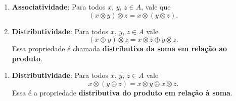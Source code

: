 \documentclass{beamer}
\begin{document}
    \begin{frame}
        \begin{definicao}
            \begin{enumerate}[label={\roman*})]
                \conti

                \item \textbf{Associatividade}: Para todos $x$, $y$, $z \in A$, vale que
                \[
                    (x\otimes y) \otimes z = x\otimes (y\otimes z).
                \]

                \vspace{.7cm}

                \item \textbf{Distributividade}: Para todos $x$, $y$, $z \in A$ vale
                \[
                    (x \oplus y)\otimes z = x\otimes z \oplus y\otimes z.
                \]
                Essa propriedade {\'e} chamada \textbf{distributiva da soma em rela{\c c}{\~a}o ao produto}.

                \vspace{.7cm}

                \seti
            \end{enumerate}
        \end{definicao}
    \end{frame}

    \begin{frame}
        \begin{definicao}
            \begin{enumerate}[label={\roman*})]
                \conti

                \item \textbf{Distributividade}: Para todos $x$, $y$, $z \in A$ vale
                \[
                    x\otimes(y \oplus z) = x\otimes y \oplus x\otimes z.
                \]
                Essa {\'e} a propriedade \textbf{distributiva do produto em rela{\c c}{\~a}o {\`a} soma}.
            \end{enumerate}
        \end{definicao}
    \end{frame}
\end{document}
